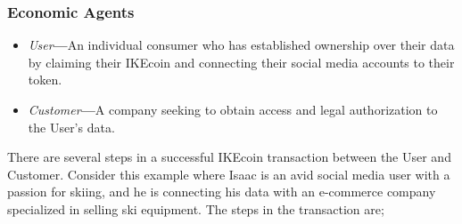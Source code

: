 \documentclass[12pt, letterpaper, twoside]{article}
\begin{document}
\subsubsection*{Economic Agents}
\begin{itemize}
\item \textit{User}\textbf{---}An individual consumer who has established ownership over their data by claiming their IKEcoin and connecting their social media accounts to their token.
\item \textit{Customer}\textbf{---}A company seeking to obtain access and legal authorization to the User's data.
\end{itemize}

There are several steps in a successful IKEcoin transaction between the User and Customer. Consider this example where Isaac is an avid social media user with a passion for skiing, and he is connecting his data with an e-commerce company specialized in selling ski equipment. The steps in the transaction are;
\end{document}
